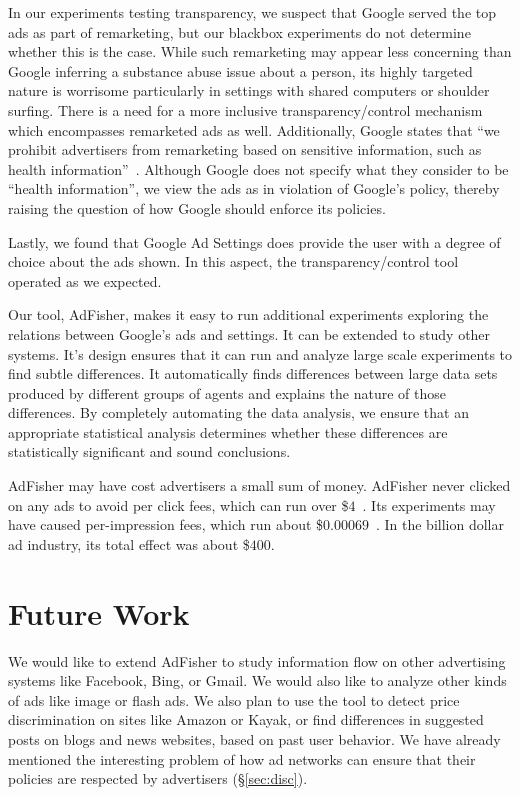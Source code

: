 \documentclass{article}
\begin{document}
In our experiments testing transparency, we suspect that Google served the top ads as part of remarketing, but our blackbox experiments do not determine whether this is the case.
While such remarketing may appear less concerning than Google inferring a substance abuse issue about a person,
its highly targeted nature is worrisome particularly in settings with shared computers or shoulder surfing.
There is a need for a more inclusive transparency/control mechanism which encompasses remarketed ads as well.
Additionally, Google states that ``we prohibit advertisers from remarketing based on sensitive information, such as health information''~\cite{google-remarketing}. Although Google does not specify what they consider to be ``health information'', we view the ads as in violation of Google's policy, thereby raising the question of how Google should enforce its policies.



Lastly, we found that Google Ad Settings does provide the user with a degree of choice about the ads shown.  
In this aspect, the transparency/control tool operated as we expected.


Our tool, AdFisher, makes it easy to run additional experiments exploring the relations between Google's ads and settings. It can be extended to study other systems.  It's design ensures that it can run and analyze large scale experiments to find subtle differences.  
It automatically finds differences between large data sets produced by different groups of agents and explains the nature of those differences.
By completely automating the data analysis, we ensure that an appropriate statistical analysis determines whether these differences are statistically significant and sound conclusions.  



AdFisher may have cost advertisers a small sum of money.
AdFisher never clicked on any ads to avoid per click fees, which can run over \$$4$~\cite{adgooroo}.
Its experiments may have caused per-impression fees, which run about \$$0.00069$~\cite{olejnik13ndss}.
In the billion dollar ad industry, its total effect was about \$$400$. 




\section{Future Work}

We would like to extend AdFisher to study information flow on other advertising systems like Facebook, Bing, or Gmail. We would also like to analyze other kinds of ads like image or flash ads. We also plan to use the tool to detect price discrimination on sites like Amazon or Kayak, or find differences in suggested posts on blogs and news websites, based on past user behavior. We have already mentioned the interesting problem of how ad networks can ensure that their policies are respected by advertisers (\S\ref{sec:disc}).
\end{document}
